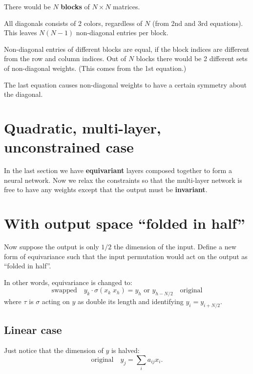 There would be $N$ \textbf{blocks} of $N \times N$ matrices.

All diagonals consists of 2 colors, regardless of $N$ (from 2nd and 3rd equations).  This leaves $N (N - 1)$ non-diagonal entries per block.

Non-diagonal entries of different blocks are equal, if the block indices are different from the row and column indices.  Out of $N$ blocks there would be 2 different sets of non-diagonal weights.  (This comes from the 1st equation.)

The last equation causes non-diagonal weights to have a certain symmetry about the diagonal.  

\section{Quadratic, multi-layer, unconstrained case}

In the last section we have \textbf{equivariant} layers composed together to form a neural network.  Now we relax the constraints so that the multi-layer network is free to have any weights except that the output must be \textbf{invariant}.




\section{With output space ``folded in half''}

Now suppose the output is only $1/2$ the dimension of the input.  Define a new form of equivariance such that the input permutation would act on the output as ``folded in half''. 

In other words, equivariance is changed to:
\begin{equation}
\boxed{\mbox{swapped}} \quad y_k \cdot \sigma(x_k \; x_h) = y_h \mbox{  or  } y_{h-N/2} \quad \boxed{\mbox{original}} \end{equation}
where $\tau$ is $\sigma$ acting on $y$ as double its length and identifying $y_i = y_{i + N/2}$.

\subsection{Linear case}

Just notice that the dimension of $y$ is halved:
\begin{equation}
\boxed{\mbox{original}} \quad y_j = \sum_i a_{ij} x_i .
\end{equation}

